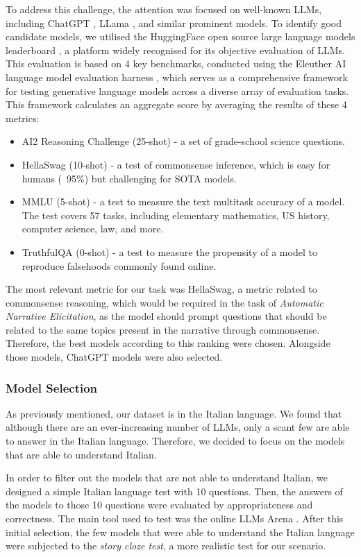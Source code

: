 To address this challenge, the attention was focused on well-known LLMs, including ChatGPT \cite{chatgpt}, LLama \cite{touvronllama}, and similar prominent models. To identify good candidate models, we utilised the HuggingFace open source large language models leaderboard \cite{huggingface-leaderboard}, a platform widely recognised for its objective evaluation of LLMs. This evaluation is based on 4 key benchmarks, conducted using the Eleuther AI language model evaluation harness \cite{eleuther}, which serves as a comprehensive framework for testing generative language models across a diverse array of evaluation tasks. This framework calculates an aggregate score by averaging the results of these 4 metrics:
\begin{itemize}
    \item {AI2 Reasoning Challenge (25-shot)} \cite{AI2} - a set of grade-school science questions.
    \item {HellaSwag (10-shot)} \cite{HellaSwag} - a test of commonsense inference, which is easy for humans (~95\%) but challenging for SOTA models.
    \item {MMLU (5-shot)} \cite{MMLU} - a test to measure the text multitask accuracy of a model. The test covers 57 tasks, including elementary mathematics, US history, computer science, law, and more.
    \item {TruthfulQA (0-shot)} \cite{Truthful} - a test to measure the propensity of a model to reproduce falsehoods commonly found online.
\end{itemize}
The most relevant metric for our task was HellaSwag, a metric related to commonsense reasoning, which would be required in the  task of \emph{Automatic Narrative Elicitation}, as the model should prompt questions that should be related to the same topics present in the narrative through commonsense. Therefore, the best models according to this ranking were chosen. Alongside those models, ChatGPT models were also selected. 

\subsubsection{Model Selection}
As previously mentioned, our dataset is in the Italian language. We found that although there are an ever-increasing number of LLMs, only a scant few are able to answer in the Italian language. Therefore, we decided to focus on the models that are able to understand Italian.

In order to filter out the models that are not able to understand Italian, we designed a simple Italian language test with 10 questions. Then, the answers of the models to those 10 questions were evaluated by appropriateness and correctness. The main tool used to test was the online LLMs Arena \cite{arena}. After this initial selection, the few models that were able to understand the Italian language were subjected to the \emph{story cloze test}, a more realistic test for our scenario.

